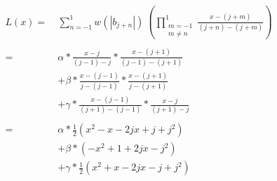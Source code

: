 \documentclass[a4paper,10pt,twocolumn]{article}
\begin{document}
\begin{align*}
    L(x) =\ & \sum_{n=-1}^{1} w(|b_{j + n}|) \ \left(\prod_{\substack{m=-1\\m \neq n}}^{1} \frac{x - (j + m)}{(j + n) - (j + m)}\right) \\
\\[-3mm]
         =\ & \alpha * \frac{x - j}      {(j - 1) - j}       * \frac{x - (j + 1)}{(j - 1) - (j + 1)} \\
         &+ \beta    * \frac{x - (j - 1)}{j - (j - 1)}       * \frac{x - (j + 1)}{j - (j + 1)} \\
         &+ \gamma   * \frac{x - (j - 1)}{(j + 1) - (j - 1)} * \frac{x - j}      {(j + 1) - j} \\
\\[-2mm]
         =\ & \alpha * \frac{1}{2}(x^2 - x - 2jx + j + j^2) \\
         &+ \beta    * (-x^2 + 1 + 2jx - j^2) \\
         &+ \gamma   * \frac{1}{2}(x^2 + x - 2jx - j + j^2)
\end{align*}
\end{document}
